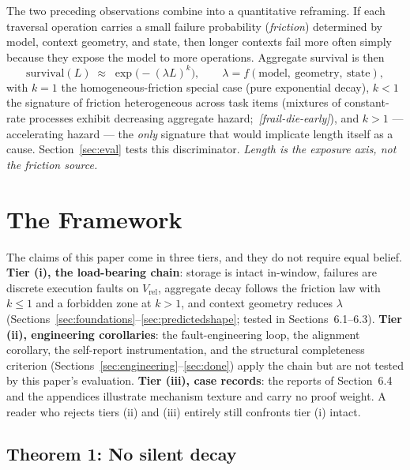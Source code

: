 \documentclass[11pt]{article}
\theoremstyle{remark}
\newif\ifslugs \slugstrue  %
\newcommand{\slug}[1]{\ifslugs\,{\small\textit{[#1]}}\fi}
\newcommand{\Vrel}{V_{\mathrm{rel}}}
\begin{document}
The two preceding observations combine into a quantitative reframing. If each
traversal operation carries a small failure probability (\emph{friction}) determined
by model, context geometry, and state, then longer contexts fail more often simply
because they expose the model to more operations. Aggregate survival is then
\begin{equation}
\mathrm{survival}(L) \;\approx\; \exp\!\big(-(\lambda L)^{k}\big),
\qquad \lambda = f(\text{model},\ \text{geometry},\ \text{state}),
\label{eq:weibull}
\end{equation}
with $k = 1$ the homogeneous-friction special case (pure exponential decay), $k < 1$
the signature of friction heterogeneous across task items (mixtures of constant-rate
processes exhibit decreasing aggregate hazard; \citealp{proschan1963}\slug{frail-die-early}), and $k > 1$
--- accelerating hazard --- the \emph{only} signature that would implicate length
itself as a cause. Section~\ref{sec:eval} tests this discriminator.
\emph{Length is the exposure axis, not the friction source.}

\section{The Framework}
\label{sec:framework}

The claims of this paper come in three tiers, and they do not require equal
belief. \textbf{Tier (i), the load-bearing chain}: storage is intact
in-window, failures are discrete execution faults on $\Vrel$, aggregate decay
follows the friction law with $k \le 1$ and a forbidden zone at $k > 1$, and
context geometry reduces $\lambda$ (Sections~\ref{sec:foundations}--\ref{sec:predictedshape};
tested in Sections~6.1--6.3). \textbf{Tier (ii), engineering corollaries}:
the fault-engineering loop, the alignment corollary, the self-report
instrumentation, and the structural completeness criterion
(Sections~\ref{sec:engineering}--\ref{sec:done}) apply the chain but are not
tested by this paper's evaluation. \textbf{Tier (iii), case records}: the
reports of Section~6.4 and the appendices illustrate mechanism texture and
carry no proof weight. A reader who rejects tiers (ii) and (iii) entirely
still confronts tier (i) intact.

\subsection{Theorem 1: No silent decay}
\end{document}
